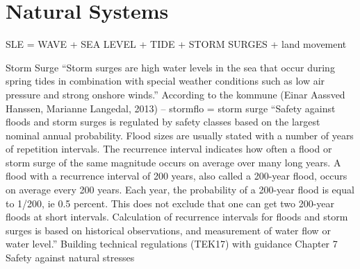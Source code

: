 \documentclass{article}
\begin{document}
\section{Natural Systems }
SLE = WAVE + SEA LEVEL + TIDE + STORM SURGES + land movement

Storm Surge
“Storm surges are high water levels in the sea that occur during spring tides in combination with special weather conditions such as low air pressure and strong onshore winds.” According to the kommune (Einar Aassved Hanssen, Marianne Langedal, 2013) – stormflo = storm surge
“Safety against floods and storm surges is regulated by safety classes based on the
largest nominal annual probability. Flood sizes are usually stated with a number of
years of repetition intervals. The recurrence interval indicates how often a flood or
storm surge of the same magnitude occurs on average over many long years. A flood
with a recurrence interval of 200 years, also called a 200-year flood, occurs on average
every 200 years. Each year, the probability of a 200-year flood is equal to 1/200, ie 0.5 percent.
This does not exclude that one can get two 200-year floods at short intervals.
Calculation of recurrence intervals for floods and storm surges is based on historical
observations, and measurement of water flow or water level.”
Building technical regulations (TEK17) with guidance Chapter 7 Safety against natural stresses
\end{document}
